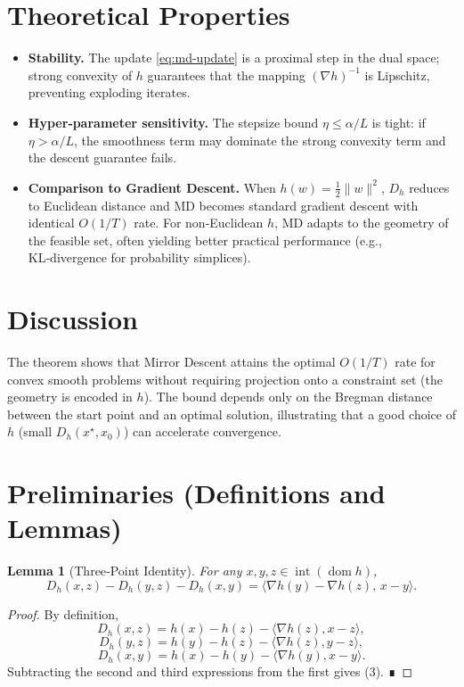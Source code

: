 \documentclass{article}
\newtheorem{lemma}{Lemma}
\newcommand{\Breg}{D_h}
\begin{document}
\section*{Theoretical Properties}
\begin{itemize}
\item \textbf{Stability.} The update \eqref{eq:md-update} is a proximal step in the dual space; strong convexity of $h$ guarantees that the mapping $(\nabla h)^{-1}$ is Lipschitz, preventing exploding iterates.
\item \textbf{Hyper‑parameter sensitivity.} The stepsize bound $\eta\le\alpha/L$ is tight: if $\eta>\alpha/L$, the smoothness term may dominate the strong convexity term and the descent guarantee fails.
\item \textbf{Comparison to Gradient Descent.} When $h(w)=\frac12\|w\|^{2}$, $\Breg$ reduces to Euclidean distance and MD becomes standard gradient descent with identical $O(1/T)$ rate. For non‑Euclidean $h$, MD adapts to the geometry of the feasible set, often yielding better practical performance (e.g., KL‑divergence for probability simplices).
\end{itemize}

\section*{Discussion}
The theorem shows that Mirror Descent attains the optimal $O(1/T)$ rate for convex smooth problems without requiring projection onto a constraint set (the geometry is encoded in $h$). The bound depends only on the Bregman distance between the start point and an optimal solution, illustrating that a good choice of $h$ (small $\Breg(x^\star,x_0)$) can accelerate convergence.

\newpage
\section*{Preliminaries (Definitions and Lemmas)}
\begin{lemma}[Three‑Point Identity]\label{lem:three-point}
For any $x,y,z\in\operatorname{int}(\operatorname{dom}h)$,
\[
\Breg(x,z)-\Breg(y,z)-\Breg(x,y)=\langle\nabla h(y)-\nabla h(z),\,x-y\rangle .
\tag{3}
\]
\end{lemma}
\begin{proof}
By definition,
\[
\Breg(x,z)=h(x)-h(z)-\langle\nabla h(z),x-z\rangle,
\]
\[
\Breg(y,z)=h(y)-h(z)-\langle\nabla h(z),y-z\rangle,
\]
\[
\Breg(x,y)=h(x)-h(y)-\langle\nabla h(y),x-y\rangle .
\]
Subtracting the second and third expressions from the first gives (3). ∎
\end{proof}
\end{document}
